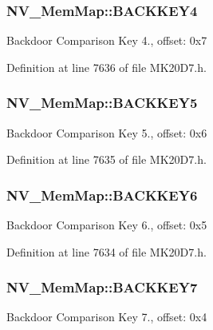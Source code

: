 \subsubsection[{\texorpdfstring{B\+A\+C\+K\+K\+E\+Y4}{BACKKEY4}}]{ N\+V\+\_\+\+Mem\+Map\+::\+B\+A\+C\+K\+K\+E\+Y4}\hypertarget{struct_n_v___mem_map_ae4e87676d4d9881d1d60af4176b6d6f5}{}\label{struct_n_v___mem_map_ae4e87676d4d9881d1d60af4176b6d6f5}
Backdoor Comparison Key 4., offset\+: 0x7 

Definition at line 7636 of file M\+K20\+D7.\+h.

\subsubsection[{\texorpdfstring{B\+A\+C\+K\+K\+E\+Y5}{BACKKEY5}}]{ N\+V\+\_\+\+Mem\+Map\+::\+B\+A\+C\+K\+K\+E\+Y5}\hypertarget{struct_n_v___mem_map_a46e84393478a41f6958c4f382cad11b7}{}\label{struct_n_v___mem_map_a46e84393478a41f6958c4f382cad11b7}
Backdoor Comparison Key 5., offset\+: 0x6 

Definition at line 7635 of file M\+K20\+D7.\+h.

\subsubsection[{\texorpdfstring{B\+A\+C\+K\+K\+E\+Y6}{BACKKEY6}}]{ N\+V\+\_\+\+Mem\+Map\+::\+B\+A\+C\+K\+K\+E\+Y6}\hypertarget{struct_n_v___mem_map_aa2013cbf54568a1ed52cd6205b4b0b35}{}\label{struct_n_v___mem_map_aa2013cbf54568a1ed52cd6205b4b0b35}
Backdoor Comparison Key 6., offset\+: 0x5 

Definition at line 7634 of file M\+K20\+D7.\+h.

\subsubsection[{\texorpdfstring{B\+A\+C\+K\+K\+E\+Y7}{BACKKEY7}}]{ N\+V\+\_\+\+Mem\+Map\+::\+B\+A\+C\+K\+K\+E\+Y7}\hypertarget{struct_n_v___mem_map_a398eb38f0e2b4a9da6562e42ed7a40b3}{}\label{struct_n_v___mem_map_a398eb38f0e2b4a9da6562e42ed7a40b3}
Backdoor Comparison Key 7., offset\+: 0x4 

